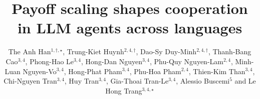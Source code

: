 \documentclass[openacc]{rsproca_new}
\begin{document}
\title{Payoff scaling shapes cooperation in LLM agents across languages}

\author{The Anh Han$^{1,\dagger,\star}$, Trung-Kiet Huynh$^{2,4,\dagger}$, Dao-Sy Duy-Minh$^{2,4,\dagger}$, Thanh-Bang Cao$^{3,4}$, Phong-Hao Le$^{3,4}$, Hong-Dan Nguyen$^{3,4}$, Phu-Quy Nguyen-Lam$^{2,4}$, Minh-Luan Nguyen-Vo$^{3,4}$, Hong-Phat Pham$^{3,4}$, Phu-Hoa Pham$^{2,4}$, Thien-Kim Than$^{3,4}$, Chi-Nguyen Tran$^{3,4}$, Huy Tran$^{3,4}$, Gia-Thoai Tran-Le$^{3,4}$, Alessio Buscemi$^{5}$ and Le Hong Trang$^{3,4,\star}$}

\address{$^{1}$School of Computing, Engineering and Digital Technologies, Teesside University, Middlesbrough, United Kingdom\\
$^{2}$Faculty of Information Technology, University of Science (HCMUS), Ho Chi Minh City, Vietnam\\
$^{3}$Faculty of Computer Science and Engineering, Ho Chi Minh City University of Technology (HCMUT), Ho Chi Minh City, Vietnam\\
$^{4}$Vietnam National University, Ho Chi Minh City (VNU-HCM), Ho Chi Minh City, Vietnam\\
$^{5}$Luxembourg Institute of Science and Technology (LIST), Luxembourg\\[4pt]
$^{\dagger}$These authors contributed equally to this work.\\
$^{\star}$Corresponding authors.}

\subject{artificial intelligence, game theory, multi-agent systems}



\end{document}

